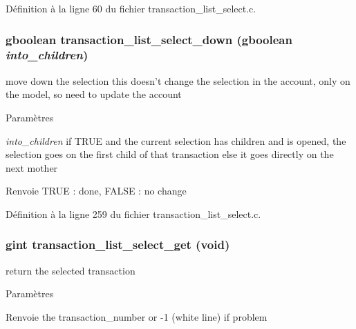 Définition à la ligne 60 du fichier transaction\_\-list\_\-select.c.

\subsubsection[{transaction\_\-list\_\-select\_\-down}]{\setlength{\rightskip}{0pt plus 5cm}gboolean transaction\_\-list\_\-select\_\-down (gboolean {\em into\_\-children})}\label{transaction__list__select_8h_aad826f93d59044effba7ca1c31eccabb}
move down the selection this doesn't change the selection in the account, only on the model, so need to update the account


\begin{DoxyParams}{Paramètres}
\item[{\em into\_\-children}]if TRUE and the current selection has children and is opened, the selection goes on the first child of that transaction else it goes directly on the next mother\end{DoxyParams}
\begin{DoxyReturn}{Renvoie}
TRUE : done, FALSE : no change 
\end{DoxyReturn}


Définition à la ligne 259 du fichier transaction\_\-list\_\-select.c.

\subsubsection[{transaction\_\-list\_\-select\_\-get}]{\setlength{\rightskip}{0pt plus 5cm}gint transaction\_\-list\_\-select\_\-get (void)}\label{transaction__list__select_8h_a0a2effd6ee01ec6f9b848593b797398a}
return the selected transaction


\begin{DoxyParams}{Paramètres}
\item[{\em }]\end{DoxyParams}
\begin{DoxyReturn}{Renvoie}
the transaction\_\-number or -\/1 (white line) if problem 
\end{DoxyReturn}


